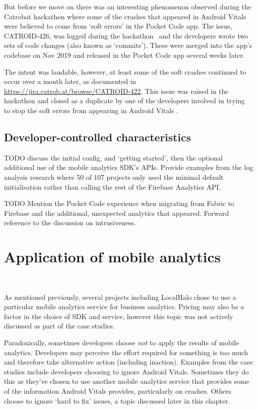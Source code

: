 But before we move on there was an interesting phenomenon observed during the Catrobat hackathon where some of the crashes that appeared in Android Vitals were believed to come from `soft errors' in the Pocket Code app. The issue, CATROID-426, was logged during the hackathon~\citep{catroid_426_soft_crashes_should_not_be_reported_to_the_play_console} and the developers wrote two sets of code changes (also known as `commits'). These were merged into the app's codebase on  Nov 2019 and released in the Pocket Code app several weeks later.

The intent was laudable, however, at least some of the soft crashes continued to occur over a month later, as documented in \url{https://jira.catrob.at/browse/CATROID-422}. This issue was raised in the hackathon and closed as a duplicate by one of the developers involved in trying to stop the soft errors from appearing in Android Vitals \citep{catroid_426_soft_crashes_should_not_be_reported_to_the_play_console}.

\subsection{Developer-controlled characteristics}
TODO discuss the initial config, and `getting started', then the optional additional use of the mobile analytics SDK's APIs. Provide examples from the log analysis research where 50 of 107 projects only used the minimal default initialisation rather than calling the rest of the Firebase Analytics API. 

TODO Mention the Pocket Code experience when migrating from Fabric to Firebase and the additional, unexpected analytics that appeared. Forward reference to the discussion on intrusiveness. 


\section{Application of mobile analytics}~\label{aiu-application-of-mobile-analytics-section}

As mentioned previously, several projects including LocalHalo chose to use a particular mobile analytics service for business analytics. Pricing may also be a factor in the choice of SDK and service, however this topic was not actively discussed as part of the case studies.

Paradoxically, sometimes developers choose \emph{not} to apply the results of mobile analytics. Developers may perceive the effort required for something is too much and therefore take alternative action (including inaction). Examples from the case studies include developers choosing to ignore Android Vitals. Sometimes they do this as they've chosen to use another mobile analytics service that provides some of the information Android Vitals provides, particularly on crashes. Others choose to ignore `hard to fix' issues, a topic discussed later in this chapter.


